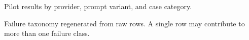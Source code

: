 \documentclass[11pt]{article}
\begin{document}
\begin{table}[h]
\centering

\caption{Pilot results by provider, prompt variant, and case category.}
\label{tab:category-summary}
\end{table}

\begin{table}[h]
\centering

\caption{Failure taxonomy regenerated from raw rows. A single row may contribute to more than one failure class.}
\label{tab:failure-taxonomy}
\end{table}



\end{document}

